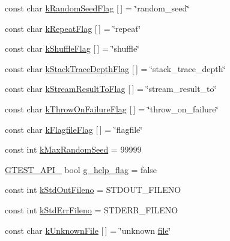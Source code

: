 \begin{DoxyCompactItemize}
const char \hyperlink{namespacetesting_1_1internal_a964ad71443cfda304b3208bf5d2daa75}{k\+Random\+Seed\+Flag} \mbox{[}$\,$\mbox{]} = \char`\"{}random\+\_\+seed\char`\"{}
\item 
const char \hyperlink{namespacetesting_1_1internal_a764ee423d39ebb8e10c53ab9b685cd9b}{k\+Repeat\+Flag} \mbox{[}$\,$\mbox{]} = \char`\"{}repeat\char`\"{}
\item 
const char \hyperlink{namespacetesting_1_1internal_affd2c1118505cb97d8ff728c95fc722b}{k\+Shuffle\+Flag} \mbox{[}$\,$\mbox{]} = \char`\"{}shuffle\char`\"{}
\item 
const char \hyperlink{namespacetesting_1_1internal_ad6f90e66d431ca3a9084408878c2cc77}{k\+Stack\+Trace\+Depth\+Flag} \mbox{[}$\,$\mbox{]} = \char`\"{}stack\+\_\+trace\+\_\+depth\char`\"{}
\item 
const char \hyperlink{namespacetesting_1_1internal_a84f8a2102d45c8b2b35be06d14ffefb8}{k\+Stream\+Result\+To\+Flag} \mbox{[}$\,$\mbox{]} = \char`\"{}stream\+\_\+result\+\_\+to\char`\"{}
\item 
const char \hyperlink{namespacetesting_1_1internal_ad9efcf363de3483afd91c7393a4fefb8}{k\+Throw\+On\+Failure\+Flag} \mbox{[}$\,$\mbox{]} = \char`\"{}throw\+\_\+on\+\_\+failure\char`\"{}
\item 
const char \hyperlink{namespacetesting_1_1internal_aa1ffe15dea227d4dded912e43a8eed84}{k\+Flagfile\+Flag} \mbox{[}$\,$\mbox{]} = \char`\"{}flagfile\char`\"{}
\item 
const int \hyperlink{namespacetesting_1_1internal_a41bd421ace53d23dbe85d9618c3afaee}{k\+Max\+Random\+Seed} = 99999
\item 
\hyperlink{gtest-port_8h_aa73be6f0ba4a7456180a94904ce17790}{G\+T\+E\+S\+T\+\_\+\+A\+P\+I\+\_\+} bool \hyperlink{namespacetesting_1_1internal_a93a772f5e51973b105d91cbb66a203f4}{g\+\_\+help\+\_\+flag} = false
\item 
const int \hyperlink{namespacetesting_1_1internal_a24f0a3d50cac54a9132f4828ec9b96d9}{k\+Std\+Out\+Fileno} = S\+T\+D\+O\+U\+T\+\_\+\+F\+I\+L\+E\+NO
\item 
const int \hyperlink{namespacetesting_1_1internal_a747eccfdbdee3ff8af3bedc476a57c85}{k\+Std\+Err\+Fileno} = S\+T\+D\+E\+R\+R\+\_\+\+F\+I\+L\+E\+NO
\item 
const char \hyperlink{namespacetesting_1_1internal_abae7a5775c901f2fd12b058b00d09840}{k\+Unknown\+File} \mbox{[}$\,$\mbox{]} = \char`\"{}unknown \hyperlink{_07copy_08_2_read_camera_model_8m_a151631b2fd2bb776ef06c9f440a7ed74}{file}\char`\"{}
\item 

\end{DoxyCompactItemize}
